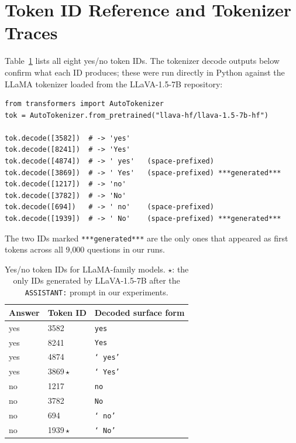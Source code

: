 \documentclass[11pt,letterpaper]{article}
\begin{document}



\newpage


\appendix

\section{Token ID Reference and Tokenizer Traces}
\label{app:tokens}

Table~\ref{tab:tokenids} lists all eight yes/no token IDs. The tokenizer
decode outputs below confirm what each ID produces; these were run
directly in Python against the LLaMA tokenizer loaded from the
LLaVA-1.5-7B repository:

\begin{lstlisting}
from transformers import AutoTokenizer
tok = AutoTokenizer.from_pretrained("llava-hf/llava-1.5-7b-hf")

tok.decode([3582])  # -> 'yes'
tok.decode([8241])  # -> 'Yes'
tok.decode([4874])  # -> ' yes'   (space-prefixed)
tok.decode([3869])  # -> ' Yes'   (space-prefixed) ***generated***
tok.decode([1217])  # -> 'no'
tok.decode([3782])  # -> 'No'
tok.decode([694])   # -> ' no'    (space-prefixed)
tok.decode([1939])  # -> ' No'    (space-prefixed) ***generated***
\end{lstlisting}

The two IDs marked \texttt{***generated***} are the only ones that
appeared as first tokens across all 9{,}000 questions in our runs.

\begin{table}[h]
\caption{Yes/no token IDs for LLaMA-family models. $\star$: the only
IDs generated by LLaVA-1.5-7B after the \texttt{ASSISTANT:} prompt in
our experiments.}
\label{tab:tokenids}
\centering
\begin{tabular}{lll}
\toprule
Answer & Token ID & Decoded surface form \\
\midrule
yes & 3582 & \texttt{yes} \\
yes & 8241 & \texttt{Yes} \\
yes & 4874 & \texttt{`\,yes'} \\
yes & 3869\,$\star$ & \texttt{`\,Yes'} \\
\midrule
no  & 1217 & \texttt{no} \\
no  & 3782 & \texttt{No} \\
no  &  694 & \texttt{`\,no'} \\
no  & 1939\,$\star$ & \texttt{`\,No'} \\
\bottomrule
\end{tabular}
\end{table}
\end{document}
